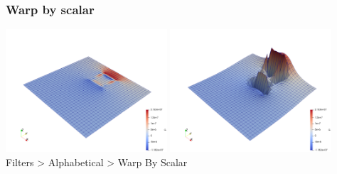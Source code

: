 \subsubsection*{Warp by scalar}

\begin{center}
\includegraphics[width=6cm]{images/paraview/p15a}
\includegraphics[width=6cm]{images/paraview/p15b}\\
{\captionfont Filters > Alphabetical > Warp By Scalar} 
\end{center}






